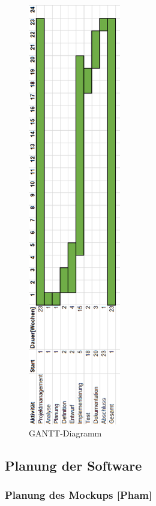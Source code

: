 \begin{figure}[!h]
	\includegraphics[width=\textwidth,height=50em,keepaspectratio]{img/projektablaufplan-gantt}
	\caption[GANTT-Diagramm]{GANTT-Diagramm\footnotemark}
\end{figure}

\clearpage


\subsection{Planung der Software}

\subsubsection{Planung des Mockups [Pham]}

